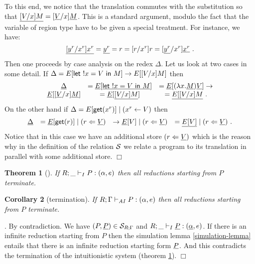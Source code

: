 \documentclass[11pt]{article}
\newtheorem{theorem}{Theorem}
\newtheorem{corollary}[theorem]{Corollary}
\newcommand{\Proof}{\noindent {\sc Proof}. }
\newcommand{\qed}{\hfill${\Box}$}
\newcommand{\cl}[1]{{\cal #1}}          \newcommand{\la}{\langle}               \newcommand{\ra}{\rangle}
\newcommand{\arrow}{\rightarrow}        \newcommand{\trarrow}{\stackrel{*}{\rightarrow}}        \newcommand{\limp}{\multimap} \newcommand{\bang}{\oc}
\newcommand{\letm}[3]{{\sf let} \ ! #1 = #2 \ {\sf in} \ #3}    \newcommand{\tertype}{{\bf 1}}
\newcommand{\get}[1]{{\sf get}(#1)}
\newcommand{\store}[2]{(#1 \leftarrow #2)}
\newcommand{\pstore}[2]{(#1 \Leftarrow #2)}
\begin{document}
To this end, we notice that the translation commutes with the substitution
so that $\underline{[V/x]M} = [\underline{V}/x]\underline{M}$. This is a standard argument,
modulo the fact that the variable of region type have to be given a special treatment.
For instance, we have:
\[
\underline{[y^r/x^r]x^r} = \underline{y^r} = r = [r/x^r]r = [\underline{y^r}/x^r]\underline{x^r}~.
\]
Then one proceeds by case analysis on the redex $\Delta$.
Let us look at two cases in some detail.
If $\Delta = E[\letm{x}{V}{M}] \arrow E[[V/x]M]$ then 
\[
\begin{array}{cccc}
\forget{\Delta}  &= \forget{E}[\forget{\letm{x}{V}{M}}]  
                 &= \forget{E}[(\lambda x.\forget{M})\forget{V}] \arrow \\
                  \forget{E}[[\forget{V}/x]\forget{M}] 
                 &= \forget{E}[\forget{[V/x]M}] 
                 &= \forget{E[[V/x]M}~.
\end{array}
\]
On the other hand if $\Delta = E[\get{x^r}] \mid \store{x^r}{V}$ then
\[
\begin{array}{llll}
\forget{\Delta}  &= \forget{E}[\get{r}] \mid \pstore{r}{\forget{V}} 
                 &\arrow \forget{E}[V] \mid \pstore{r}{\forget{V}} 
                 &=\forget{E[V]} \mid \pstore{r}{\forget{V}}~.
\end{array}
\]
Notice that in this case we have an additional store $\pstore{r}{\forget{V}}$ which
is the reason why in the definition of the relation $\cl{S}$ 
we relate a program to its translation in parallel with some additional store.
\qed


\begin{theorem}[\cite{Amadio09}]\label{thm-ter-intuitionistic}
If $R;\_\vdash_{I} P:(\alpha,e)$ then all reductions starting from $P$ terminate.
\end{theorem}


\begin{corollary}[termination]
If $R;\Gamma \vdash_{{\it AI}} P:(\alpha,e)$ then all reductions starting from $P$ terminate.
\end{corollary}
\Proof
By contradiction. 
We have $(P,\forget{P})\in \cl{S}_{R;\Gamma}$ and 
$R;\_ \vdash_{I} \underline{P}:(\underline{\alpha},e)$.
If there is an infinite reduction starting from $P$
then the simulation lemma \ref{simulation-lemma}
entails that there is an infinite reduction starting
form $\underline{P}$. 
And this contradicts the termination of the intuitionistic system
(theorem \ref{thm-ter-intuitionistic}).  \qed
\end{document}
